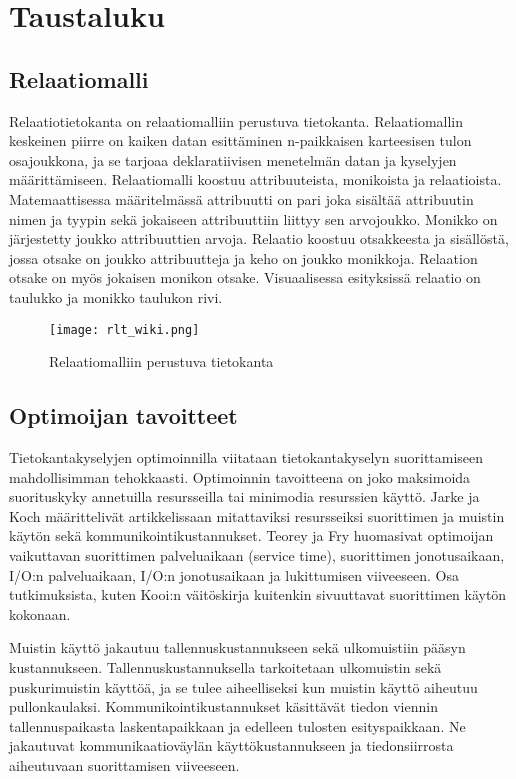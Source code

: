 \documentclass[finnish]{tktltiki2}
\theoremstyle{definition}
\theoremstyle{remark}
\begin{document}
\section{Taustaluku}
\subsection{Relaatiomalli}

Relaatiotietokanta on relaatiomalliin \cite{codd1970relational} perustuva tietokanta. Relaatiomallin keskeinen piirre on kaiken datan esittäminen n-paikkaisen karteesisen tulon osajoukkona, ja se tarjoaa deklaratiivisen menetelmän datan ja kyselyjen määrittämiseen. Relaatiomalli koostuu attribuuteista, monikoista ja relaatioista. Matemaattisessa määritelmässä attribuutti on pari joka sisältää attribuutin nimen ja tyypin sekä jokaiseen attribuuttiin liittyy sen arvojoukko. Monikko on järjestetty joukko attribuuttien arvoja. Relaatio koostuu otsakkeesta ja sisällöstä, jossa otsake on joukko attribuutteja ja keho on joukko monikkoja. Relaation otsake on myös jokaisen monikon otsake. Visuaalisessa esityksissä relaatio on taulukko ja monikko taulukon rivi. 

\begin{figure}[!h]
  \caption{Relaatiomalliin perustuva tietokanta}
  \centering
    \texttt{[image: rlt\_wiki.png]}
\end{figure}

\subsection{Optimoijan tavoitteet}
Tietokantakyselyjen optimoinnilla viitataan tietokantakyselyn suorittamiseen mahdollisimman tehokkaasti. Optimoinnin tavoitteena on joko maksimoida suorituskyky annetuilla resursseilla tai minimodia resurssien käyttö. Jarke ja Koch määrittelivät artikkelissaan \cite{jarke1984} mitattaviksi resursseiksi suorittimen ja muistin käytön sekä kommunikointikustannukset. Teorey ja Fry \cite{teorey1982design} huomasivat optimoijan vaikuttavan suorittimen palveluaikaan (service time), suorittimen jonotusaikaan, I/O:n palveluaikaan, I/O:n jonotusaikaan ja lukittumisen viiveeseen. Osa tutkimuksista, kuten Kooi:n väitöskirja \cite{kooi1980optimization} kuitenkin sivuuttavat suorittimen käytön kokonaan.

Muistin käyttö jakautuu tallennuskustannukseen sekä ulkomuistiin pääsyn kustannukseen. Tallennuskustannuksella tarkoitetaan ulkomuistin sekä puskurimuistin käyttöä, ja se tulee aiheelliseksi kun muistin käyttö aiheutuu pullonkaulaksi. Kommunikointikustannukset käsittävät tiedon viennin tallennuspaikasta laskentapaikkaan ja edelleen tulosten esityspaikkaan. Ne jakautuvat kommunikaatioväylän käyttökustannukseen ja tiedonsiirrosta aiheutuvaan suorittamisen viiveeseen.
\end{document}
